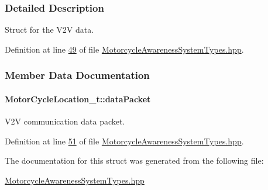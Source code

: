 \subsubsection{Detailed Description}
Struct for the V2\-V data. 

Definition at line \hyperlink{MotorcycleAwarenessSystemTypes_8hpp_source_l00049}{49} of file \hyperlink{MotorcycleAwarenessSystemTypes_8hpp_source}{Motorcycle\-Awareness\-System\-Types.\-hpp}.



\subsubsection{Member Data Documentation}
\hypertarget{structMotorCycleLocation__t_a1f854587b19dbe91dffd637ce70be62e}{
\paragraph[{data\-Packet}]{ Motor\-Cycle\-Location\-\_\-t\-::data\-Packet}}\label{structMotorCycleLocation__t_a1f854587b19dbe91dffd637ce70be62e}


V2\-V communication data packet. 



Definition at line \hyperlink{MotorcycleAwarenessSystemTypes_8hpp_source_l00051}{51} of file \hyperlink{MotorcycleAwarenessSystemTypes_8hpp_source}{Motorcycle\-Awareness\-System\-Types.\-hpp}.



The documentation for this struct was generated from the following file\-:\begin{DoxyCompactItemize}
\item 
\hyperlink{MotorcycleAwarenessSystemTypes_8hpp}{Motorcycle\-Awareness\-System\-Types.\-hpp}\end{DoxyCompactItemize}
